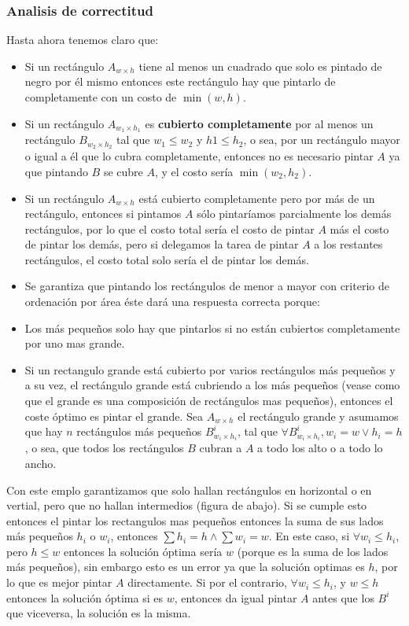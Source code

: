 \documentclass{article}
\begin{document}
\subsubsection{Analisis de correctitud}
	Hasta ahora tenemos claro que:
	\begin{itemize}
	
\item Si un rectángulo $A_{w \times h}$ tiene al menos un cuadrado que solo es pintado de negro por él mismo entonces este rectángulo hay que pintarlo de completamente con un costo de $\min {(w, h)}$.

\item Si un rectángulo $A_{w_1 \times h_1}$ es \textbf{cubierto completamente} por al menos un rectángulo $B_{ w_2 \times h_2}$ tal que $w_1 \leq w_2$ y $h1 \leq h_2$, o sea, por un rectángulo mayor o igual a él que lo cubra completamente, entonces no es necesario pintar $A$ ya que pintando $B$ se cubre $A$, y el costo sería $\min{(w_2, h_2)}$.
\item Si un rectángulo $A_{w \times h}$ está cubierto completamente pero por más de un rectángulo, entonces si pintamos $A$ sólo pintaríamos parcialmente los demás rectángulos, por lo que el costo total sería el costo de pintar $A$ más el costo de pintar los demás, pero si delegamos la tarea de pintar $A$ a los restantes rectángulos, el costo total solo sería el de pintar los demás.
\item Se garantiza que pintando los rectángulos de menor a mayor con criterio de ordenación por área éste dará una respuesta correcta porque:
  
\item Los más pequeños solo hay que pintarlos si no están cubiertos completamente por uno mas grande.
\item Si un rectangulo grande está cubierto por varios rectángulos más pequeños y a su vez, el rectángulo grande está cubriendo a los más pequeños (vease como que el grande es una composición de rectángulos mas pequeños), entonces el coste óptimo es pintar el grande. Sea $A_{w \times h}$ el rectángulo grande y asumamos que hay $n$ rectángulos más pequeños $B^{i}_{w_i \times h_i}$, tal que $\forall B^{i}_{w_i \times h_i}, w_i = w \lor h_i = h$, o sea, que todos los rectángulos $B$ cubran a $A$ a todo los alto o a todo lo ancho. 
  
  \end{itemize}

    Con este emplo garantizamos que solo hallan rectángulos en horizontal o en vertial, pero que no hallan intermedios (figura de abajo). Si se cumple esto entonces el pintar los rectangulos mas pequeños entonces la suma de sus lados más pequeños $h_i$ o $w_i$, entonces $\sum{h_i} = h \land \sum{w_i} = w$. En este caso, si $\forall w_i \leq h_i$, pero $h \leq w$ entonces la solución óptima sería $w$ (porque es la suma de los lados más pequeños), sin embargo esto es un error ya que la solución optimas es $h$, por lo que es mejor pintar $A$ directamente.
    Si por el contrario, $\forall w_i \leq h_i$, y $w \leq h$ entonces la solución óptima si es $w$, entonces da igual pintar $A$ antes que los $B^{i}$ que viceversa, la solución es la misma.
  
\end{document}
